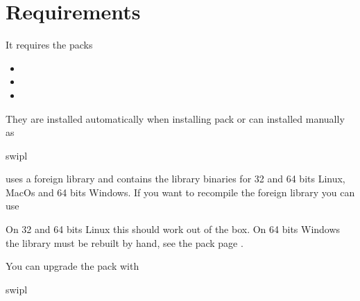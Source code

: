 \documentclass[letterpaper,10pt,english]{sphinxmanual}
\begin{document}
\section{Requirements}
\label{\detokenize{index:requirements}}
\sphinxAtStartPar
It requires the packs
\begin{itemize}
\item {} 
\sphinxAtStartPar
{}

\item {} 
\sphinxAtStartPar
{}

\item {} 
\sphinxAtStartPar
{}

\end{itemize}

\sphinxAtStartPar
They are installed automatically when installing pack  or can installed manually as

\begin{sphinxVerbatim}[commandchars=\\\{\}]
swipl
\end{sphinxVerbatim}

\sphinxAtStartPar
{} uses a foreign library and contains the library binaries for 32 and 64 bits Linux, MacOs and 64 bits Windows. If you want to recompile the foreign library you can use

\begin{sphinxVerbatim}[commandchars=\\\{\}]
 
\end{sphinxVerbatim}

\sphinxAtStartPar
On 32 and 64 bits Linux this should work out of the box. On 64 bits Windows the library must be rebuilt by hand, see the pack page .

\sphinxAtStartPar
You can upgrade the pack with

\begin{sphinxVerbatim}[commandchars=\\\{\}]
swipl
\end{sphinxVerbatim}
\end{document}
